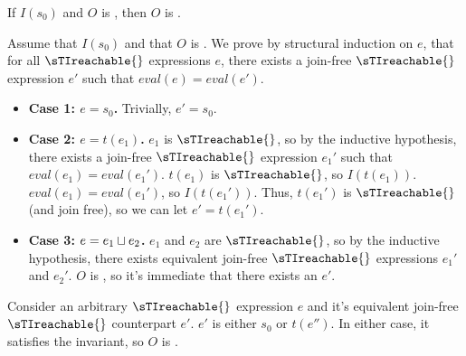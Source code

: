 \begin{claim}
  If $I(s_0)$ and $O$ is \sTImergereducible, then $O$ is \sTIconfluent.
\end{claim}
\begin{elidableproof}
  Assume that $I(s_0)$ and that $O$ is \sTImergereducible{}. We prove by structural
  induction on $e$, that for all $\sTIreachable{}$ expressions $e$, there
  exists a join-free $\sTIreachable{}$ expression $e'$ such that $eval(e) =
  eval(e')$.
  \begin{itemize}
    \item \textbf{Case 1: $e = s_0$.}
      Trivially, $e' = s_0$.

    \item \textbf{Case 2: $e = t(e_1)$.}
      $e_1$ is $\sTIreachable{}$, so by the inductive hypothesis, there exists
      a join-free $\sTIreachable{}$ expression $e_1'$ such that $eval(e_1) =
      eval(e_1')$. $t(e_1)$ is $\sTIreachable{}$, so $I(t(e_1))$. $eval(e_1) =
      eval(e_1')$, so $I(t(e_1'))$. Thus, $t(e_1')$ is $\sTIreachable{}$ (and join
      free), so we can let $e' = t(e_1')$.

    \item \textbf{Case 3: $e = e_1 \sqcup e_2$.}
      $e_1$ and $e_2$ are $\sTIreachable{}$, so by the inductive hypothesis,
      there exists equivalent join-free $\sTIreachable{}$ expressions $e_1'$
      and $e_2'$. $O$ is \sTImergereducible{}, so it's immediate that there exists
      an $e'$.
  \end{itemize}

  Consider an arbitrary $\sTIreachable{}$ expression $e$ and it's equivalent
  join-free $\sTIreachable{}$ counterpart $e'$. $e'$ is either $s_0$ or
  $t(e'')$.  In either case, it satisfies the invariant, so $O$ is
  \sTIconfluent{}.
\end{elidableproof}


